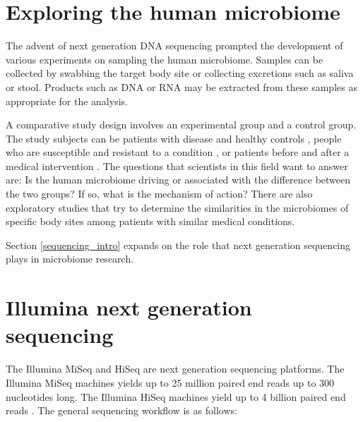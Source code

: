 \section{Exploring the human microbiome}
The advent of next generation DNA sequencing prompted the development of various experiments on sampling the human microbiome. Samples can be collected by swabbing the target body site or collecting excretions such as saliva or stool. Products such as DNA or RNA may be extracted from these samples as appropriate for the analysis.

A comparative study design involves an experimental group and a control group. The study subjects can be patients with disease and healthy controls \cite{macklaim2013comparative}, people who are susceptible and resistant to a condition \cite{theriot2014antibiotic}, or patients before and after a medical intervention \cite{graessler2013metagenomic}. The questions that scientists in this field want to answer are: Is the human microbiome driving or associated with the difference between the two groups? If so, what is the mechanism of action? There are also exploratory studies that try to determine the similarities in the microbiomes of specific body sites among patients with similar medical conditions.

Section \ref{sequencing_intro} expands on the role that next generation sequencing plays in microbiome research.

\section{Illumina next generation sequencing}
The Illumina MiSeq and HiSeq are next generation sequencing platforms. The Illumina MiSeq machines yields up to 25 million paired end reads up to 300 nucleotides long. The Illumina HiSeq machines yield up to 4 billion paired end reads \cite{bentley2008accurate}. The general sequencing workflow is as follows:

